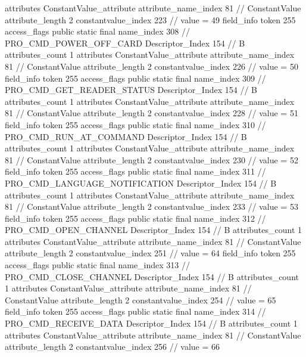 {{{{{				attributes {
				ConstantValue_attribute {
					attribute_name_index	81		// ConstantValue
					attribute_length	2
					constantvalue_index	223		// value = 49
				}
				}
			}
			field_info {
				token	255
				access_flags	public static final
				name_index	308		// PRO_CMD_POWER_OFF_CARD
				Descriptor_Index	154		// B
				attributes_count	1
				attributes {
				ConstantValue_attribute {
					attribute_name_index	81		// ConstantValue
					attribute_length	2
					constantvalue_index	226		// value = 50
				}
				}
			}
			field_info {
				token	255
				access_flags	public static final
				name_index	309		// PRO_CMD_GET_READER_STATUS
				Descriptor_Index	154		// B
				attributes_count	1
				attributes {
				ConstantValue_attribute {
					attribute_name_index	81		// ConstantValue
					attribute_length	2
					constantvalue_index	228		// value = 51
				}
				}
			}
			field_info {
				token	255
				access_flags	public static final
				name_index	310		// PRO_CMD_RUN_AT_COMMAND
				Descriptor_Index	154		// B
				attributes_count	1
				attributes {
				ConstantValue_attribute {
					attribute_name_index	81		// ConstantValue
					attribute_length	2
					constantvalue_index	230		// value = 52
				}
				}
			}
			field_info {
				token	255
				access_flags	public static final
				name_index	311		// PRO_CMD_LANGUAGE_NOTIFICATION
				Descriptor_Index	154		// B
				attributes_count	1
				attributes {
				ConstantValue_attribute {
					attribute_name_index	81		// ConstantValue
					attribute_length	2
					constantvalue_index	233		// value = 53
				}
				}
			}
			field_info {
				token	255
				access_flags	public static final
				name_index	312		// PRO_CMD_OPEN_CHANNEL
				Descriptor_Index	154		// B
				attributes_count	1
				attributes {
				ConstantValue_attribute {
					attribute_name_index	81		// ConstantValue
					attribute_length	2
					constantvalue_index	251		// value = 64
				}
				}
			}
			field_info {
				token	255
				access_flags	public static final
				name_index	313		// PRO_CMD_CLOSE_CHANNEL
				Descriptor_Index	154		// B
				attributes_count	1
				attributes {
				ConstantValue_attribute {
					attribute_name_index	81		// ConstantValue
					attribute_length	2
					constantvalue_index	254		// value = 65
				}
				}
			}
			field_info {
				token	255
				access_flags	public static final
				name_index	314		// PRO_CMD_RECEIVE_DATA
				Descriptor_Index	154		// B
				attributes_count	1
				attributes {
				ConstantValue_attribute {
					attribute_name_index	81		// ConstantValue
					attribute_length	2
					constantvalue_index	256		// value = 66
				}
				}
}}}}}
